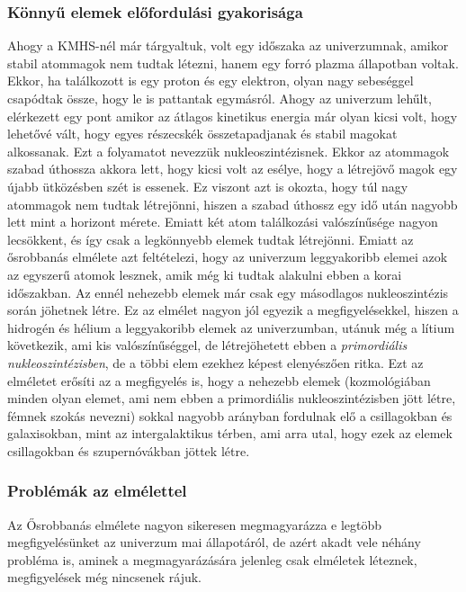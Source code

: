 \documentclass[../main.tex]{subfiles}
\begin{document}
\subsubsection*{Könnyű elemek előfordulási gyakorisága}
Ahogy a KMHS-nél már tárgyaltuk, volt egy időszaka az univerzumnak, amikor stabil atommagok nem tudtak létezni, hanem egy forró plazma állapotban voltak. Ekkor, ha találkozott is egy proton és egy elektron,
olyan nagy sebeséggel csapódtak össze, hogy le is pattantak egymásról. Ahogy az univerzum lehűlt, elérkezett egy pont amikor az átlagos kinetikus energia már olyan kicsi volt, hogy lehetővé vált, hogy
egyes részecskék összetapadjanak és stabil magokat alkossanak. Ezt a folyamatot nevezzük nukleoszintézisnek. Ekkor az atommagok szabad úthossza akkora lett, hogy kicsi volt az esélye, hogy a létrejövő magok
egy újabb ütközésben szét is essenek. Ez viszont azt is okozta, hogy túl nagy atommagok nem tudtak létrejönni, hiszen a szabad úthossz egy idő után nagyobb lett mint a horizont mérete.
Emiatt két atom találkozási valószínűsége nagyon lecsökkent, és így csak a legkönnyebb elemek tudtak létrejönni. Emiatt az ősrobbanás elmélete azt feltételezi, hogy az univerzum leggyakoribb elemei azok az egyszerű atomok lesznek,
amik még ki tudtak alakulni ebben a korai időszakban. Az ennél nehezebb elemek már csak egy másodlagos nukleoszintézis során jöhetnek létre. Ez az elmélet nagyon jól egyezik a megfigyelésekkel, hiszen a hidrogén és hélium a leggyakoribb elemek az univerzumban, utánuk még a lítium következik, ami kis valószínűséggel,
de létrejöhetett ebben a \textit{primordiális nukleoszintézisben}, de a többi elem ezekhez képest elenyészően ritka. Ezt az elméletet erősíti az a megfigyelés is, hogy a nehezebb elemek (kozmológiában minden olyan elemet, ami nem ebben a
primordiális nukleoszintézisben jött létre, fémnek szokás nevezni) sokkal nagyobb arányban fordulnak elő a csillagokban és galaxisokban, mint az intergalaktikus térben, ami arra utal, hogy ezek az elemek csillagokban és szupernóvákban jöttek létre.

\subsubsection{Problémák az elmélettel}
Az Ősrobbanás elmélete nagyon sikeresen megmagyarázza e legtöbb megfigyelésünket az univerzum mai állapotáról, de azért akadt vele néhány probléma is, aminek a megmagyarázására jelenleg csak elméletek léteznek,
megfigyelések még nincsenek rájuk.
\end{document}
